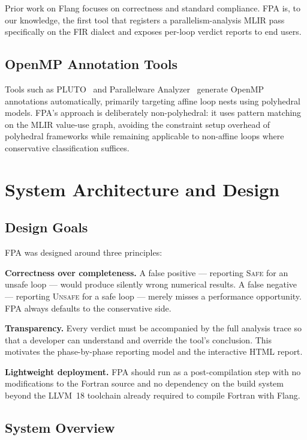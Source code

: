 \documentclass[conference]{IEEEtran}
\begin{document}
Prior work on Flang focuses on correctness and standard compliance.
FPA is, to our knowledge, the first tool that registers a
parallelism-analysis MLIR pass specifically on the FIR dialect and
exposes per-loop verdict reports to end users.

\subsection{OpenMP Annotation Tools}

Tools such as PLUTO~\cite{bondhugula2008practical} and
Parallelware Analyzer~\cite{parallelware} generate OpenMP annotations
automatically, primarily targeting affine loop nests using polyhedral
models.  FPA's approach is deliberately non-polyhedral: it uses
pattern matching on the MLIR value-use graph, avoiding the constraint
setup overhead of polyhedral frameworks while remaining applicable to
non-affine loops where conservative classification suffices.

\section{System Architecture and Design}
\label{sec:architecture}

\subsection{Design Goals}

FPA was designed around three principles:

\textbf{Correctness over completeness.}
A false positive — reporting \textsc{Safe} for an unsafe loop — would
produce silently wrong numerical results.  A false negative —
reporting \textsc{Unsafe} for a safe loop — merely misses a
performance opportunity.  FPA always defaults to the conservative
side.

\textbf{Transparency.}
Every verdict must be accompanied by the full analysis trace so that a
developer can understand and override the tool's conclusion.  This
motivates the phase-by-phase reporting model and the interactive HTML
report.

\textbf{Lightweight deployment.}
FPA should run as a post-compilation step with no modifications to the
Fortran source and no dependency on the build system beyond the LLVM~18
toolchain already required to compile Fortran with Flang.

\subsection{System Overview}
\end{document}

